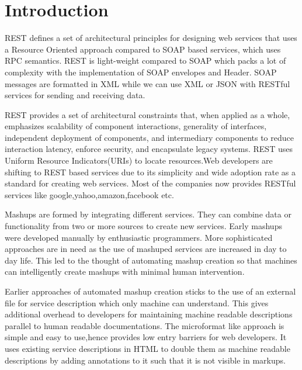\documentclass[journal]{IEEEtran}
\begin{document}
%
\IEEEpeerreviewmaketitle



\section{Introduction}

REST defines a set of architectural principles for designing web services that uses a Resource Oriented approach compared to SOAP based services, which uses RPC semantics. REST is light-weight compared to SOAP which packs a lot of complexity with the implementation of SOAP envelopes and Header. SOAP messages are formatted in XML while we can use XML or JSON with RESTful services for sending and receiving data. 

REST provides a set of architectural constraints that, when applied as a whole, emphasizes scalability of component interactions, generality of interfaces, independent deployment of components, and intermediary components to reduce interaction latency, enforce security, and encapsulate legacy systems. REST uses Uniform Resource Indicators(URIs) to locate resources.Web developers are shifting to REST based services due to its simplicity and wide adoption rate as a standard for creating web services. Most of the companies now provides RESTful services like google,yahoo,amazon,facebook etc.

Mashups are formed by integrating  different services. They can combine data or functionality from two or more sources to create  new services. Early mashups were developed manually by enthusiastic programmers. More sophisticated approaches are in need as the use of mashuped services are increased in day to day life. This led to the thought of automating mashup creation so that machines can intelligently create mashups with minimal human intervention.

Earlier approaches of automated mashup creation sticks to the use of an external file for service description which only machine can understand. This gives additional overhead to developers for maintaining machine readable descriptions parallel to human readable documentations. The microformat \cite{kopecky2008hrests} like approach is simple and easy to use,hence provides low entry barriers for web developers. It uses existing service descriptions in HTML to double them as machine readable descriptions by adding annotations to it such that it is not visible in markups.
\end{document}
